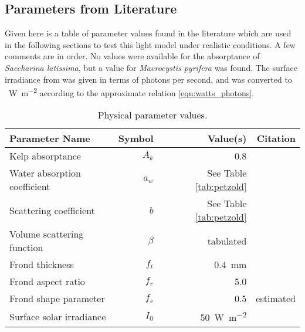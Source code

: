 \subsection{Parameters from Literature}
Given here is a table of parameter values found in the literature which are used in the following sections to test this light model under realistic conditions.
A few comments are in order.
No values were available for the absorptance of \textit{Saccharina latissima}, but a value for \textit{Macrocystis pyrifera} was found.
The surface irradiance from \cite{broch_modelling_2012} was given in terms of photons per second,
and was converted to \SI{}{\W\per\m\squared} according to the approximate relation \eqref{eqn:watts_photons}.

\begin{table}[h]
  \centering
  \caption{Physical parameter values.}
  \begin{tabular}{lrrr}
    \toprule
    Parameter Name & Symbol & Value(s) & Citation \\ %
    \midrule
    Kelp absorptance & $A_k$ & 0.8 & \cite{colombo-pallotta_photosynthetic_2006} \\%
    Water absorption coefficient & $a_w$ & See Table \ref{tab:petzold} & \cite{petzold_volume_1972} \\%
    Scattering coefficient & $b$  & See Table \ref{tab:petzold} & \cite{petzold_volume_1972} \\%
    Volume scattering function & $\beta$ & tabulated & \cite{petzold_volume_1972,sokolov_parameterization_2010} \\%
    Frond thickness & $f_t$ & \SI{0.4}{\mm} & \cite{foldal_morphological_2018} \\
    Frond aspect ratio & $f_r$ & 5.0 & \cite{foldal_morphological_2018} \\
    Frond shape parameter & $f_s$ & 0.5 & estimated \\
    Surface solar irradiance & $I_0$ & \SI{50}{\W\per\m\squared} & \cite{broch_modelling_2012}  \\%
    \bottomrule
  \end{tabular}
  \label{tab:params}
\end{table}

